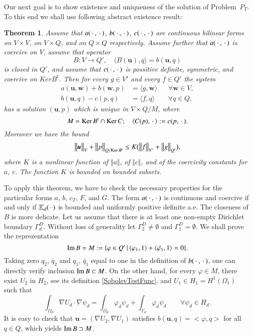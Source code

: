 \documentclass{elsarticle}
\newtheorem{thm}{Theorem}[section]
\def\grad{\nabla}
\def\to{\rightarrow}
\def\argdot{{\hspace{0.18em}\cdot\hspace{0.18em}}}
\def\vc#1{\mathbf{\boldsymbol{#1}}}     %
\def\tn#1{{\mathbb{#1}}}    %
\def\norm#1{\bigl\Vert#1\bigr\Vert} %
\def\where{\,|\,}                    %
\def\vl{{\vc{u}}}
\def\phi{\varphi}
\def\mr{\mathring}
\def\Im{{\rm Im\,}}
\def\Ker{{\rm Ker\,}}
\begin{document}
Our next goal is to show existence and uniqueness of the solution of Problem~$P_T$. To this end we shall
use following abstract existence result:
\begin{thm}\cite[Theorem 1.2]{fortin_mixed_1991}
\label{thm_ex_fortin}
Assume that $a(\argdot,\argdot)$, $b(\argdot,\argdot)$, $c(\argdot,\argdot)$ are continuous bilinear forms 
on $V\times V$, on $V\times Q$, and on $Q\times Q$ respectively. Assume further that $a(\argdot,\argdot)$ is coercive on $V$, assume that operator 
\[
  B: V\to Q',\quad \langle B(\vl), q\rangle = b(\vl,q)
\]
is closed in $Q'$, and assume that $c(\argdot,\argdot)$ is possitive definite, symmetric,
and coercive on $Ker B^t$. Then for every $g\in V'$ and every $f\in Q'$ the system
\begin{align}
        \label{Saddle1}
 a(\vl,\vc w) + b(\vc w, p) &= \langle g, \vc w \rangle &&\forall \vc w\in V,\\
        \label{Saddle2}
 b(\vl, q) - c(p,q) &= \langle f, q \rangle &&\forall q \in Q,
\end{align}
has a solution $(\vl,p)$ which is unique in $V\times Q/M$, where
\[
 M=\Ker B^t \cap \Ker C;\quad \langle C(p), \argdot \rangle:=c(p,\argdot).
\]
Moreover we have the bound
\begin{equation}\label{SolEst}
   \norm{\vl}_V + \norm{p}_{Q/\Ker B^t} \le K\big(\norm{f}_{V'}+\norm{g}_{Q'}\big),
\end{equation}
where $K$ is  a nonlinear function of $\norm{a}$, of $\norm{c}$, and of the coercivity constants for $a$, $c$. The function $K$ is bounded on bounded subsets.
\end{thm}
To apply this theorem, we have to check the necessary properties for the particular forms $a$, $b$, $c_T$, $F$, and $G$. The form $a(\argdot,\argdot)$ is continuous and coercive if and only if $\tn K_d(\argdot)$ is bounded and uniformly positive definite a.e. The closeness of $B$ is more delicate. Let us assume that there is at least one non-empty Dirichlet boundary $\Gamma_d^D$.
Without loss of generality let $\Gamma_2^D\ne \emptyset$ and $\Gamma_1^D = \emptyset$.
We shall prove the reprezentation 
\begin{equation}
  \label{ImB}
  \Im B = M :=\{\phi\in Q'\where \langle \phi_1, 1 \rangle+\langle \mr{\phi_1}, 1\rangle=0\}.
\end{equation}
Taking zero $q_2$, $\mr{q_2}$ and
$q_1$, $\mr{q_1}$ equal to one in the definition of $b(\argdot,\argdot)$, one can directly verify inclusion $\Im B \subset M$. On the other hand, for every $\phi\in M$, there exist 
$U_2$ in $H_2$, see its definition \eqref{SobolevTestFunc}, and $U_1\in H_1=H^1(\Omega_1)$ such that 
\begin{equation}
  \label{DualB}
  \int_{\Omega_d} \grad U_d\cdot \grad\psi_d = \int_{\Omega_d} \phi_d \psi_d + \int_{\Gamma_d}\mr{\phi_d}\psi_d
  \qquad \forall \psi_d\in H_d. 
\end{equation}
It is easy to check that $\vl=(\grad U_2,\grad U_1)$ satisfies $b(\vl, q) = <\phi,q>$ for all $q\in Q$, which yields $\Im B \supset M$. 
\end{document}

